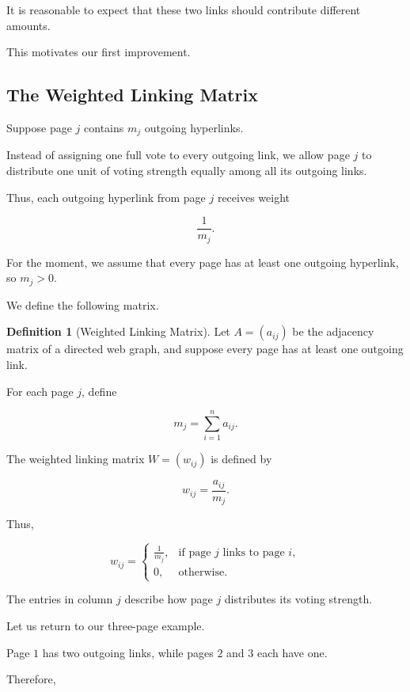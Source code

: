 \documentclass[11pt,a4paper]{article}
\theoremstyle{definition}
\newtheorem{definition}[theorem]{Definition}
\theoremstyle{remark}
\begin{document}
It is reasonable to
expect that these two
links should contribute
different amounts.

This motivates our first
improvement.


\subsection{The Weighted Linking Matrix}

Suppose page $j$ contains
$m_j$ outgoing hyperlinks.

Instead of assigning one
full vote to every outgoing
link, we allow page $j$
to distribute one unit
of voting strength equally
among all its outgoing links.

Thus, each outgoing hyperlink
from page $j$ receives
weight

\[
\frac{1}{m_j}.
\]

For the moment, we assume
that every page has at least
one outgoing hyperlink,
so $m_j>0$.

We define the following matrix.

\begin{definition}[Weighted Linking Matrix]

Let $A=(a_{ij})$ be the
adjacency matrix of a
directed web graph,
and suppose every page
has at least one outgoing link.

For each page $j$, define

\[
m_j=\sum_{i=1}^{n}a_{ij}.
\]

The weighted linking matrix
$W=(w_{ij})$ is defined by

\begin{equation}
w_{ij}
=
\frac{a_{ij}}{m_j}.
\label{eq:pagerank_weighted_entry}
\end{equation}

\end{definition}

Thus,

\[
w_{ij}
=
\begin{cases}
\frac{1}{m_j},
& \text{if page $j$ links to page $i$},\\
0,
& \text{otherwise}.
\end{cases}
\]

The entries in column $j$
describe how page $j$
distributes its voting strength.

Let us return to our
three-page example.

Page $1$ has two outgoing
links, while pages $2$
and $3$ each have one.

Therefore,
\end{document}
